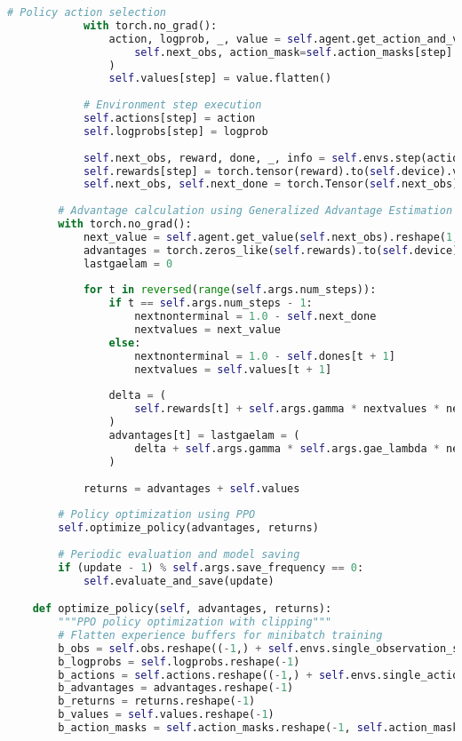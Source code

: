 \documentclass[12pt,a4paper]{article}
\begin{document}
\begin{lstlisting}[language=Python, caption=PPO Trainer Core Logic]
            # Policy action selection
            with torch.no_grad():
                action, logprob, _, value = self.agent.get_action_and_value(
                    self.next_obs, action_mask=self.action_masks[step]
                )
                self.values[step] = value.flatten()
            
            # Environment step execution
            self.actions[step] = action
            self.logprobs[step] = logprob
            
            self.next_obs, reward, done, _, info = self.envs.step(action.cpu().numpy())
            self.rewards[step] = torch.tensor(reward).to(self.device).view(-1)
            self.next_obs, self.next_done = torch.Tensor(self.next_obs).to(self.device), torch.Tensor(done).to(self.device)
        
        # Advantage calculation using Generalized Advantage Estimation (GAE)
        with torch.no_grad():
            next_value = self.agent.get_value(self.next_obs).reshape(1, -1)
            advantages = torch.zeros_like(self.rewards).to(self.device)
            lastgaelam = 0
            
            for t in reversed(range(self.args.num_steps)):
                if t == self.args.num_steps - 1:
                    nextnonterminal = 1.0 - self.next_done
                    nextvalues = next_value
                else:
                    nextnonterminal = 1.0 - self.dones[t + 1]
                    nextvalues = self.values[t + 1]
                
                delta = (
                    self.rewards[t] + self.args.gamma * nextvalues * nextnonterminal - self.values[t]
                )
                advantages[t] = lastgaelam = (
                    delta + self.args.gamma * self.args.gae_lambda * nextnonterminal * lastgaelam
                )
            
            returns = advantages + self.values
        
        # Policy optimization using PPO
        self.optimize_policy(advantages, returns)
        
        # Periodic evaluation and model saving
        if (update - 1) % self.args.save_frequency == 0:
            self.evaluate_and_save(update)

    def optimize_policy(self, advantages, returns):
        """PPO policy optimization with clipping"""
        # Flatten experience buffers for minibatch training
        b_obs = self.obs.reshape((-1,) + self.envs.single_observation_space.shape)
        b_logprobs = self.logprobs.reshape(-1)
        b_actions = self.actions.reshape((-1,) + self.envs.single_action_space.shape)
        b_advantages = advantages.reshape(-1)
        b_returns = returns.reshape(-1)
        b_values = self.values.reshape(-1)
        b_action_masks = self.action_masks.reshape(-1, self.action_masks.shape[-1])
        

\end{lstlisting}
\end{document}
